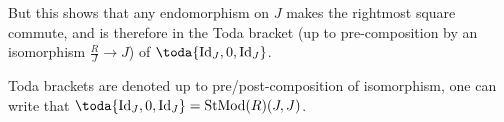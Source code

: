 But this shows that any endomorphism on \( J \) makes the rightmost square commute, and is therefore in the Toda bracket (up to pre-composition by an isomorphism \( \frac{R}{J} \to J \)) of \( \toda{\Id_J, 0, \Id_J} \). 

Toda brackets are denoted up to pre/post-composition of isomorphism, one can write that \( \toda{\Id_J, 0, \Id_J} = \StMod(R)(J, J) \).
